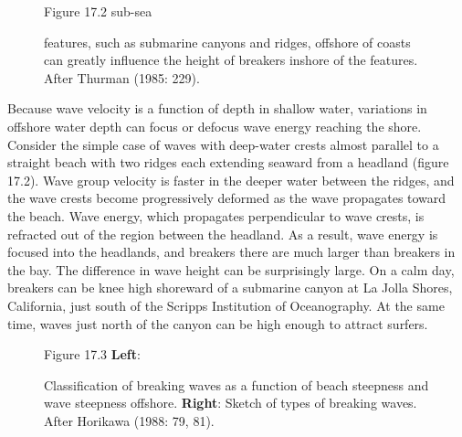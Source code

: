 \begin{figure}[b!]
\vspace{-1ex}
\centering
{}
\footnotesize
Figure 17.2 sub-sea \rule{0mm}{4ex}features, such as submarine canyons and ridges, offshore of coasts can greatly influence the height of breakers inshore of the features. After Thurman (1985: 229).

\label{wavefocusing}
\end{figure}

Because wave velocity is a function of depth in shallow water, variations in offshore water depth can focus or defocus wave energy reaching the shore. Consider the simple case of waves with deep-water crests almost parallel to a straight beach with two ridges each extending seaward from a headland (figure 17.2). Wave group velocity is faster in the deeper water between the ridges, and the wave crests become progressively deformed as the wave propagates toward the beach. Wave energy, which propagates perpendicular to wave crests, is refracted out of the region between the headland. As a result, wave energy is focused into the headlands, and breakers there are much larger than breakers in the bay. The difference in wave height can be surprisingly large. On a calm day, breakers can be knee high shoreward of a submarine canyon at La Jolla Shores, California, just south of the Scripps Institution of Oceanography. At the same time, waves just north of the canyon can be high enough to attract surfers.

\begin{figure}[t!]
\centering
{}
\footnotesize
Figure 17.3 \textbf{Left}: \rule{0mm}{3ex}Classification of breaking waves as a function of beach steepness and wave steepness offshore. \textbf{Right}: Sketch of types of breaking waves. After Horikawa (1988: 79, 81).

\label{fig:breakers}
\vspace{-3ex}
\end{figure}

